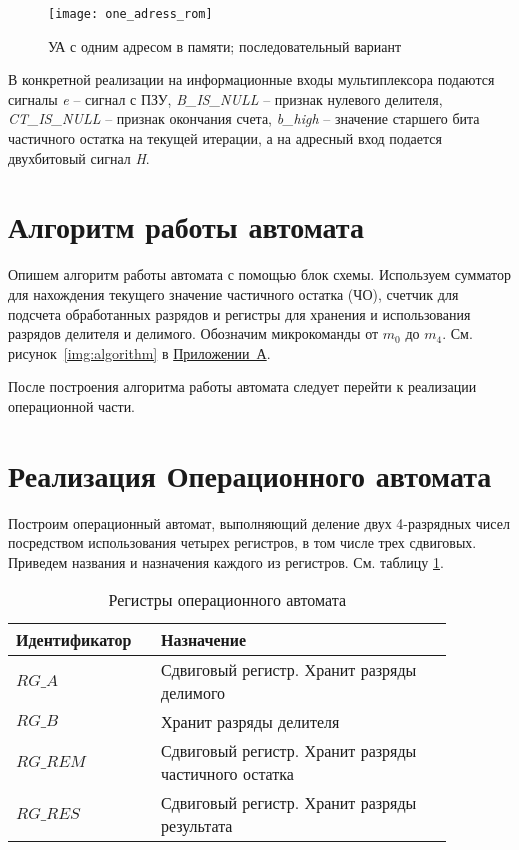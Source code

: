 \documentclass[a4paper,14pt]{extarticle}
\begin{document}
\begin{figure}[h!]
	\begin{center}
		\texttt{[image: one\_adress\_rom]}
		\caption{УА с одним адресом в памяти; последовательный вариант}
		\label{img:scheme}
	\end{center}	
\end{figure}

В конкретной реализации на информационные входы мультиплексора подаются сигналы \textit{e} -- сигнал с ПЗУ, \textit{B\_IS\_NULL} -- признак нулевого делителя, \textit{CT\_IS\_NULL} -- признак окончания счета, \textit{b\_high} -- значение старшего бита частичного остатка на текущей итерации, а на адресный вход подается двухбитовый сигнал \textit{H}.
\section{Алгоритм работы автомата}
Опишем алгоритм работы автомата с помощью блок схемы. Используем сумматор для нахождения текущего значение частичного остатка (ЧО), счетчик для подсчета обработанных разрядов и регистры для хранения и использования разрядов делителя и делимого. Обозначим микрокоманды от $m_0$ до $m_4$. См. рисунок~\ref{img:algorithm} в \hyperref[tam]{Приложении~А}.

После построения алгоритма работы автомата следует перейти к реализации операционной части.

\section {Реализация Операционного автомата}
Построим операционный автомат, выполняющий деление двух 4-разрядных чисел посредством использования четырех регистров, в том числе трех сдвиговых. Приведем названия и назначения каждого из регистров. См. таблицу \ref{tab:regs}.
\begin{table}[h!]
	\centering
		\begin{tabular}{|m{0.27\linewidth}|m{0.6\linewidth}|}
			\hline
			\textbf{Идентификатор} & \textbf{Назначение} \\ \hline
			$RG\_A$ & Сдвиговый регистр. Хранит разряды делимого \\ \hline
			$RG\_B$ & Хранит разряды делителя \\ \hline
			$RG\_REM$ & Сдвиговый регистр. Хранит разряды частичного остатка \\ \hline
			$RG\_RES$ & Сдвиговый регистр. Хранит разряды результата \\ \hline
		\end{tabular}
		\caption{Регистры операционного автомата}
		\label{tab:regs}
\end{table}
\end{document}
